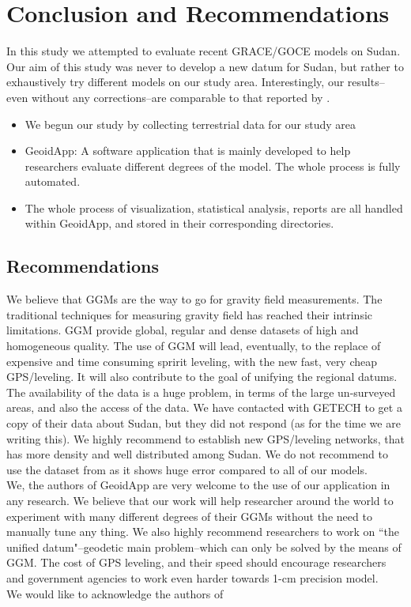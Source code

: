 \chapter{Conclusion and Recommendations}
\label{Chapter6}

In this study we attempted to evaluate recent GRACE/GOCE models on Sudan. Our aim of this study was never to develop a new datum for Sudan, but rather to exhaustively try different models on our study area. Interestingly, our results--even without any corrections--are comparable to that reported by \citep{ahmed_msc, godah}. 

\begin{itemize}
	\item We begun our study by collecting terrestrial data for our study area
	\item GeoidApp: A software application that is mainly developed to help researchers evaluate different degrees of the model. The whole process is fully automated.
	\item The whole process of visualization, statistical analysis, reports are all handled within GeoidApp, and stored in their corresponding directories.
\end{itemize}

\section{Recommendations}

We believe that GGMs are the way to go for gravity field measurements. The traditional techniques for measuring gravity field has reached their intrinsic limitations. GGM provide global, regular and dense datasets of high and homogeneous quality. The use of GGM will lead, eventually, to the replace of expensive and time consuming spririt leveling, with the new fast, very cheap GPS/leveling. It will also contribute to the goal of unifying the regional datums.
\\
The availability of the data is a huge problem, in terms of the large un-surveyed areas, and also the access of the data. We have contacted with GETECH to get a copy of their data about Sudan, but they did not respond (as for the time we are writing this). We highly recommend to establish new GPS/leveling networks, that has more density and well distributed among Sudan. We do not recommend to use the dataset from \citep{osman} as it shows huge error compared to all of our models. 
\\
We, the authors of GeoidApp are very welcome to the use of our application in any research. We believe that our work will help researcher around the world to experiment with many different degrees of their GGMs without the need to manually tune any thing. We also highly recommend researchers to work on ``the unified datum"--geodetic main problem--which can only be solved by the means of GGM. The cost of GPS leveling, and their speed should encourage researchers and government agencies to work even harder towards 1-cm precision model.
\\
We would like to acknowledge the authors of \citep{numpy, matplotlib, scipy, octave, ipython, bokeh}
